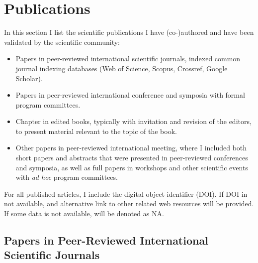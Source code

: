 \documentclass[
]{article}
\begin{document}
\section{Publications}\label{publications}

In this section I list the scientific publications I have (co-)authored
and have been validated by the scientific community:

\begin{itemize}
\item
  Papers in peer-reviewed international scientific journals, indexed
  common journal indexing databases (Web of Science, Scopus, Crossref,
  Google Scholar).
\item
  Papers in peer-reviewed international conference and symposia with
  formal program committees.
\item
  Chapter in edited books, typically with invitation and revision of the
  editors, to present material relevant to the topic of the book.
\item
  Other papers in peer-reviewed international meeting, where I included
  both short papers and abstracts that were presented in peer-reviewed
  conferences and symposia, as well as full papers in workshops and
  other scientific events with \emph{ad hoc} program committees.
\end{itemize}

For all published articles, I include the digital object identifier
(DOI). If DOI in not available, and alternative link to other related
web resources will be provided. If some data is not available, will be
denoted as NA.

\subsection{Papers in Peer-Reviewed International Scientific
Journals}\label{papers-in-peer-reviewed-international-scientific-journals}
\end{document}
